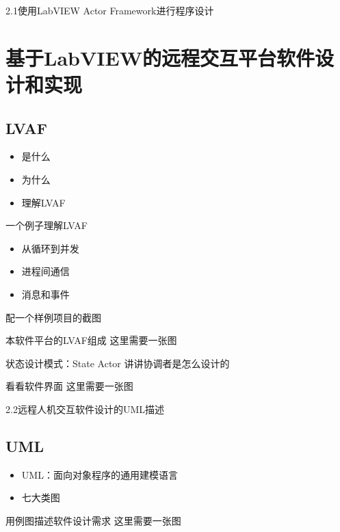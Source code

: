 \documentclass{beamer}
\begin{document}
\begin{frame}[t]{2.1使用LabVIEW Actor Framework进行程序设计}
    \section{基于LabVIEW的远程交互平台软件设计和实现}
    \subsection{LVAF}
    \begin{itemize}
        \item 是什么
        \item 为什么
        \item 理解LVAF
    \end{itemize}
\end{frame}
\begin{frame}[t]{一个例子理解LVAF}
    \begin{itemize}
        \item 从循环到并发
        \item 进程间通信
        \item 消息和事件
    \end{itemize}
    配一个样例项目的截图
\end{frame}
\begin{frame}[t]{本软件平台的LVAF组成}
    这里需要一张图
\end{frame}
\begin{frame}[t]{状态设计模式：State Actor}
    讲讲协调者是怎么设计的
\end{frame}
\begin{frame}[t]{看看软件界面}
    这里需要一张图
\end{frame}
\begin{frame}[t]{2.2远程人机交互软件设计的UML描述}
    \subsection{UML}
    \begin{itemize}
        \item UML：面向对象程序的通用建模语言
        \item 七大类图
    \end{itemize}
\end{frame}
\begin{frame}[t]{用例图描述软件设计需求}
    这里需要一张图
\end{frame}
\end{document}
